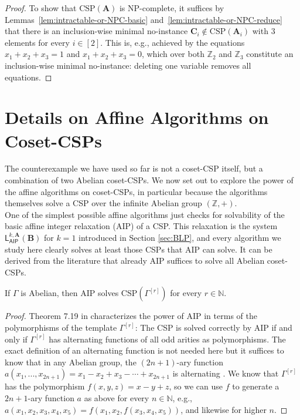 \documentclass[a4paper,english, thm-restate]{lipics-v2021}
\newcommand{\ZZ}{\mathbb{Z}}
\newcommand{\StructA}{\mathbf{A}}
\newcommand{\StructB}{\mathbf{B}}
\newcommand{\StructC}{\mathbf{C}}
\newcommand{\CSP}[1]{\mathrm{CSP}(#1)}
\newcommand{\leqs}{\mathsf{L}}
\newcommand{\aipk}[3]{\leqs^{#1,#2}_{\mathsf{AIP}} (#3)}
\newcommand{\bbN}{\mathbb{N}}
\newcommand{\bbZ}{\mathbb{Z}}
\newcommand{\CosetGrpTmplt}[2]{#1^{[#2]}}
\begin{document}
\begin{proof}
		To show that $\CSP{\StructA}$ is NP-complete,
		it suffices 
		by Lemmas~\ref{lem:intractable-or-NPC-basic} and~\ref{lem:intractable-or-NPC-reduce}
		that there is an inclusion-wise minimal no-instance $\StructC_i \notin \CSP{\StructA_i}$ with $3$ elements for every $i\in [2]$.
		This is, e.g., achieved by the equations $x_1+x_2+x_3 = 1$
		and $x_1+x_2+x_3 = 0$,
		which over both $\ZZ_2$ and $\ZZ_3$ constitute an inclusion-wise minimal no-instance:
		deleting one variable removes all equations.
	\end{proof}
	
	
	
	
	
	
	
	\section{Details on Affine Algorithms on Coset-CSPs}	
	\label{app:groupStuff}
	
	The counterexample we have used so far is not a coset-CSP itself, but a combination of two Abelian coset-CSPs.
	We now set out to explore the power of the affine algorithms on coset-CSPs, in particular because the algorithms themselves 
	solve a CSP over the infinite Abelian group $(\bbZ,+)$.\\
	
	One of the simplest possible affine algorithms just checks for solvability of the basic affine integer relaxation (AIP) of a CSP. 
	This relaxation is the system $\aipk{k}{\StructA}{\StructB}$ for $k=1$ introduced in Section \ref{sec:BLP}, and 
	every algorithm we study here clearly solves at least those CSPs that AIP can solve.
	It can be derived from the literature that already AIP suffices to solve all Abelian coset-CSPs.
	\begin{theorem}
		\label{thm:abelianSolvedByAIP}
		If $\Gamma$ is Abelian, then AIP solves $\CSP{\CosetGrpTmplt{\Gamma}{r}}$ for every $r \in \bbN$.
	\end{theorem}	
	\begin{proof}
		Theorem 7.19 in \cite{BartoBKO2021} characterizes the power of AIP in terms of the polymorphisms of the template $\CosetGrpTmplt{\Gamma}{r}$:
		The CSP is solved correctly by AIP if and only if $\CosetGrpTmplt{\Gamma}{r}$ has alternating functions of all odd arities as polymorphisms. The exact definition of an alternating function is not needed here but it suffices to know that in any Abelian group, the $(2n+1)$-ary function $a(x_1,...,x_{2n+1}) = x_1 - x_2 +x_3 - \cdots + x_{2n+1}$ is alternating \cite[Example 7.17]{BartoBKO2021}.
		We know that $\CosetGrpTmplt{\Gamma}{r}$ has the polymorphism $f(x,y,z) = x-y+z$, so we can use $f$ to generate a $2n+1$-ary function $a$ as above for every $n \in \bbN$, e.g., $a(x_1,x_2,x_3,x_4,x_5) = f(x_1,x_2,f(x_3,x_4,x_5))$, and likewise for higher $n$.  
	\end{proof}	
	
\end{document}
